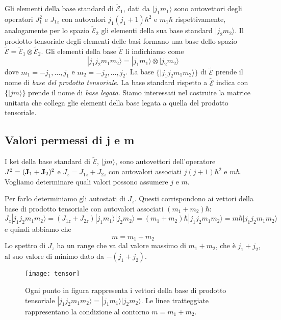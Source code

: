 Gli elementi della base standard di $\mathcal{\tilde{E}}_1$, dati da $|j_1m_1 \rangle$ sono autovettori degli operatori $J^2_1$ e $J_{1z}$ con autovalori $j_1(j_1+1)\hbar^2$ e $m_1\hbar$ rispettivamente, analogamente per lo spazio $\mathcal{\tilde{E}}_2$ gli elementi della sua base standard $|j_2 m_2 \rangle $. Il prodotto tensoriale degli elementi delle basi formano una base dello spazio $\mathcal{\tilde{E}} = \mathcal{\tilde{E}}_1 \otimes \mathcal{\tilde{E}}_2$. Gli elementi della base $\mathcal{\tilde{E}}$ li indichiamo come 
\begin{equation*}
	|j_1j_2m_1m_2 \rangle = |j_1m_1 \rangle \otimes |j_2m_2\rangle 
\end{equation*} 
dove $m_1 = -j_1,\ldots,j_1$ e $m_2 = -j_2,\ldots,j_2$. La base $\{|j_1j_2m_1m_2 \rangle\}$ di $\mathcal{\tilde{E}}$ prende il nome di \textit{base del prodotto tensoriale}. La base standard rispetto a $\mathcal{\tilde{E}}$ indica con $\{ |jm \rangle \}$ prende il nome di \textit{base legata}. Siamo interessati nel costruire la matrice unitaria che collega glie elementi della base legata a quella del prodotto tensoriale.

\subsection{Valori permessi di j e m}

I ket della base standard di $\mathcal{\tilde{E}}$, $|jm\rangle$, sono autovettori dell'operatore $J^2 = (\bold{J}_1 + \bold{J}_2)^2$ e $J_z = J_{1z} + J_{2z}$ con autovalori associati $j(j+1)\hbar^2$ e $m\hbar$. Vogliamo determinare quali valori possono assumere $j$ e $m$.

Per farlo determiniamo gli autostati di $J_z$. Questi corrispondono ai vettori della base di prodotto tensoriale con autovalori associati $(m_1 +m_2)\hbar$:
\begin{equation*}
	J_z|j_1j_2m_1m_2 \rangle = (J_{1z} + J_{2z})|j_1m_1 \rangle|j_2m_2 \rangle = (m_1 + m_2)\hbar |j_1j_2m_1m_2 \rangle  = m\hbar |j_1j_2m_1m_2 \rangle 
\end{equation*}
\newpage
e quindi abbiamo che 
\begin{equation*}
	m = m_1 +m_2
\end{equation*}
Lo spettro di $J_z$ ha un range che va dal valore massimo di $m_1 +m_2$, che \`e $j_1 + j_2$, al suo valore di minimo dato da $-(j_1+j_2)$.  
  
\begin{figure}[!ht]
\vspace{0.1in}
\texttt{[image: tensor]}	
\centering
\vspace{0.1in}
\caption{Ogni punto in figura rappresenta i vettori della base di prodotto tensoriale $|j_1j_2m_1m_2 \rangle = |j_1m_1\rangle |j_2m_2\rangle $.  Le linee tratteggiate rappresentano la condizione al contorno $m = m_1 + m_2$.  }
\end{figure}

